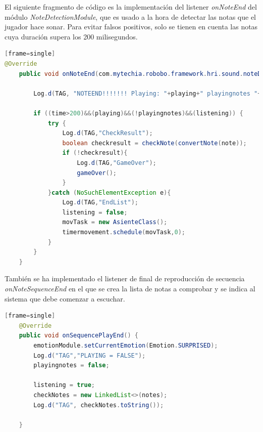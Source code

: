 \vspace{5mm} %

El siguiente fragmento de código es la implementación del listener \textit{onNoteEnd} del módulo \textit{NoteDetectionModule}, que es usado a la hora de detectar las notas que el jugador hace sonar. Para evitar falsos positivos, solo se tienen en cuenta las notas cuya duración supera los 200 milisegundos.

 \vspace{5mm} %
 
\begin{lstlisting}[language=Java][frame=single]
@Override
    public void onNoteEnd(com.mytechia.robobo.framework.hri.sound.noteDetection.Note note, long time) {

        Log.d(TAG, "NOTEEND!!!!!!! Playing: "+playing+" playingnotes "+playingnotes+" listening "+listening);

        if ((time>200)&&(playing)&&(!playingnotes)&&(listening)) {
            try {
                Log.d(TAG,"CheckResult");
                boolean checkresult = checkNote(convertNote(note));
                if (!checkresult){
                    Log.d(TAG,"GameOver");
                    gameOver();
                }
            }catch (NoSuchElementException e){
                Log.d(TAG,"EndList");
                listening = false;
                movTask = new AsienteClass();
                timermovement.schedule(movTask,0);
            }
        }
    }
\end{lstlisting}

\vspace{5mm} %

También se ha implementado el listener de final de reproducción de secuencia \textit{onNoteSequenceEnd} en el que se crea la lista de notas a comprobar y se indica al sistema que debe comenzar a escuchar.

\vspace{5mm} %

\begin{lstlisting}[language=Java][frame=single]
    @Override
    public void onSequencePlayEnd() {
        emotionModule.setCurrentEmotion(Emotion.SURPRISED);
        Log.d("TAG","PLAYING = FALSE");
        playingnotes = false;

        listening = true;
        checkNotes = new LinkedList<>(notes);
        Log.d("TAG", checkNotes.toString());

    }
\end{lstlisting}

